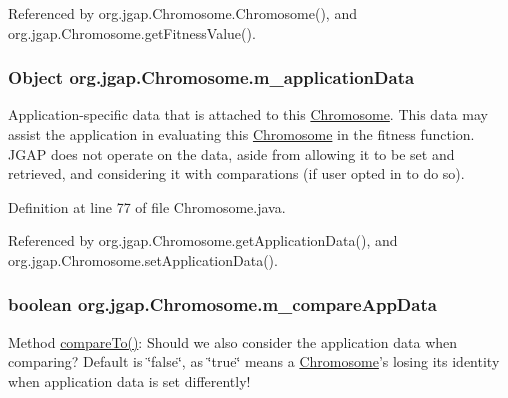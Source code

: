 Referenced by org.\-jgap.\-Chromosome.\-Chromosome(), and org.\-jgap.\-Chromosome.\-get\-Fitness\-Value().

\hypertarget{classorg_1_1jgap_1_1_chromosome_af2b4e1abcdf5995b45fb7d5cf93a559c}{
\subsubsection[{m\-\_\-application\-Data}]{\setlength{\rightskip}{0pt plus 5cm}Object org.\-jgap.\-Chromosome.\-m\-\_\-application\-Data\hspace{0.3cm}{\ttfamily [private]}}}\label{classorg_1_1jgap_1_1_chromosome_af2b4e1abcdf5995b45fb7d5cf93a559c}
Application-\/specific data that is attached to this \hyperlink{classorg_1_1jgap_1_1_chromosome}{Chromosome}. This data may assist the application in evaluating this \hyperlink{classorg_1_1jgap_1_1_chromosome}{Chromosome} in the fitness function. J\-G\-A\-P does not operate on the data, aside from allowing it to be set and retrieved, and considering it with comparations (if user opted in to do so). 

Definition at line 77 of file Chromosome.\-java.



Referenced by org.\-jgap.\-Chromosome.\-get\-Application\-Data(), and org.\-jgap.\-Chromosome.\-set\-Application\-Data().

\hypertarget{classorg_1_1jgap_1_1_chromosome_a7c696f550a4f4458ed4115833abf02fb}{
\subsubsection[{m\-\_\-compare\-App\-Data}]{\setlength{\rightskip}{0pt plus 5cm}boolean org.\-jgap.\-Chromosome.\-m\-\_\-compare\-App\-Data\hspace{0.3cm}{\ttfamily [private]}}}\label{classorg_1_1jgap_1_1_chromosome_a7c696f550a4f4458ed4115833abf02fb}
Method \hyperlink{classorg_1_1jgap_1_1_chromosome_a2be0507944e2ca98bef8372402b33e13}{compare\-To()}\-: Should we also consider the application data when comparing? Default is \char`\"{}false\char`\"{}, as \char`\"{}true\char`\"{} means a \hyperlink{classorg_1_1jgap_1_1_chromosome}{Chromosome}'s losing its identity when application data is set differently!

